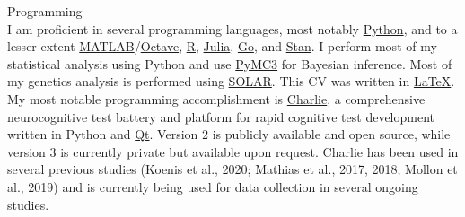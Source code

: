 \documentclass[10pt]{article}
\makeatletter
\newlength{\bibhang}
\newlength{\bibsep}
 {\@listi \global\bibsep\itemsep \global\advance\bibsep by\parsep}
\newenvironment{bibsection}%
        {\vspace{-\baselineskip}\begin{list}{}{%
       \setlength{\leftmargin}{\bibhang}%
       \setlength{\itemindent}{-\leftmargin}%
       \setlength{\itemsep}{\bibsep}%
       \setlength{\parsep}{\z@}%
        \setlength{\partopsep}{0pt}%
        \setlength{\topsep}{0pt}}}
        {\end{list}\vspace{-.6\baselineskip}}
\makeatother
\begin{document}
\begin{bibsection}
\item Programming\\
I am proficient in several programming languages, most notably \href{https://www.python.org/}{Python}, and to a lesser extent \href{https://www.mathworks.com/products/matlab.html}{MATLAB}/\href{https://www.gnu.org/software/octave/}{Octave}, \href{https://www.r-project.org/}{R}, \href{https://julialang.org/}{Julia}, \href{https://golang.org/}{Go}, and \href{https://mc-stan.org/}{Stan}. I perform most of my statistical analysis using Python and use \href{https://docs.pymc.io/}{PyMC3} for Bayesian inference. Most of my genetics analysis is performed using \href{https://hpc.nih.gov/docs/solar-8.1.1/00.contents.html}{SOLAR}. This CV was written in \href{https://www.latex-project.org/}{\LaTeX}. My most notable programming accomplishment is \href{https://github.com/sammosummo/Charlie2}{Charlie}, a comprehensive neurocognitive test battery and platform for rapid cognitive test development written in Python and \href{https://www.qt.io/}{Qt}. Version 2 is publicly available and open source, while version 3 is currently private but available upon request. Charlie has been used in several previous studies (Koenis et al., 2020; Mathias et al., 2017, 2018; Mollon et al., 2019) and is currently being used for data collection in several ongoing studies.

\end{bibsection}
\end{document}
